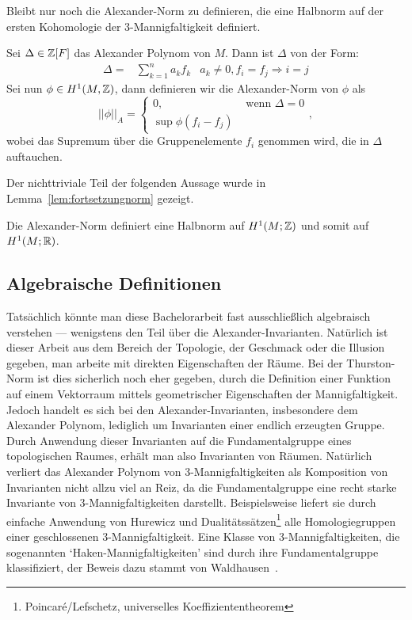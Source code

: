     	Bleibt nur noch die Alexander-Norm zu definieren, die eine Halbnorm auf der ersten Kohomologie der 3-Mannigfaltigkeit definiert.
    	\begin{defn}
    		Sei  $\Delta \in \mathbb{Z} [F]$ das Alexander Polynom von $M$. Dann ist $\Delta$ von der Form:
    		\begin{align*}
    		    			\Delta = &\sum_{k=1}^n a_k f_k& a_k \neq 0, f_i = f_j \Rightarrow i=j
    		\end{align*}
    		Sei nun $\phi \in H^1 (M,\mathbb{Z})$, dann definieren wir die Alexander-Norm von $\phi$ als
    		\[
    			||\phi||_A = \begin{cases}
    				0 , &\text{ wenn } \Delta=0\\
    				\sup \phi (f_i - f_j) &
    			\end{cases},
    		\]
    		wobei das Supremum über die Gruppenelemente $f_i$ genommen wird, die in $\Delta$ auftauchen.
    	\end{defn}

    	Der nichttriviale Teil der folgenden Aussage wurde in Lemma~\ref{lem:fortsetzungnorm} gezeigt.
    	\begin{lem}
    		Die Alexander-Norm definiert eine Halbnorm auf $H^1(M;\mathbb{Z})$ und somit auf $H^1(M;\mathbb{R})$.
    	\end{lem}


    \subsection{Algebraische Definitionen}
\label{sec:algebra}

Tatsächlich könnte man diese Bachelorarbeit fast ausschließlich algebraisch verstehen --- wenigstens den Teil über die Alexander-Invarianten. Natürlich ist dieser Arbeit aus dem Bereich der Topologie, der Geschmack oder die Illusion gegeben, man arbeite mit direkten Eigenschaften der Räume. Bei der Thurston-Norm ist dies sicherlich noch eher gegeben, durch die Definition einer Funktion auf einem Vektorraum mittels geometrischer Eigenschaften der Mannigfaltigkeit. Jedoch handelt es sich bei den Alexander-Invarianten, insbesondere dem Alexander Polynom, lediglich um Invarianten einer endlich erzeugten Gruppe. Durch Anwendung dieser Invarianten auf die Fundamentalgruppe eines topologischen Raumes, erhält man also Invarianten von Räumen. Natürlich verliert das Alexander Polynom von 3-Mannigfaltigkeiten als Komposition von Invarianten nicht allzu viel an Reiz, da die Fundamentalgruppe eine recht starke Invariante von 3-Mannigfaltigkeiten darstellt. Beispielsweise liefert sie durch einfache Anwendung von Hurewicz und Dualitätssätzen\footnote{Poincaré/Lefschetz, universelles Koeffiziententheorem} alle Homologiegruppen einer geschlossenen 3-Mannigfaltigkeit. Eine Klasse von 3-Mannigfaltigkeiten, die sogenannten `Haken-Mannigfaltigkeiten' sind durch ihre Fundamentalgruppe klassifiziert, der Beweis dazu stammt von Waldhausen~\cite{Waldhausen.1968}. 

